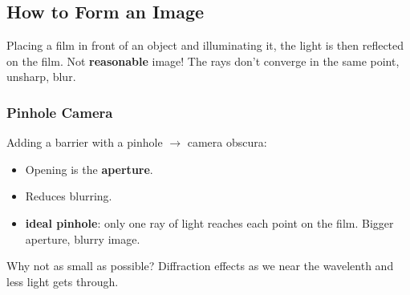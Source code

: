 \documentclass[a4paper,12 pt]{article}
\theoremstyle{definition}
\theoremstyle{remark}
\theoremstyle{definition}
\theoremstyle{definition}
\theoremstyle{definition}
\theoremstyle{remark}
\theoremstyle{definition}
\begin{document}
\subsection*{How to Form an Image}
Placing a film in front of an object and illuminating it, the light is then reflected on the film. Not \textbf{reasonable} image! The rays don't converge in the same point, unsharp, blur.
\subsubsection*{Pinhole Camera}
Adding a barrier with a pinhole $\rightarrow$ camera obscura:
\begin{itemize}
\item Opening is the \textbf{aperture}.
\item Reduces blurring.
\item \textbf{ideal pinhole}: only one ray of light reaches each point on the film. Bigger aperture, blurry image.
\end{itemize}
Why not as small as possible? Diffraction effects as we near the wavelenth and less light gets through.
\end{document}
